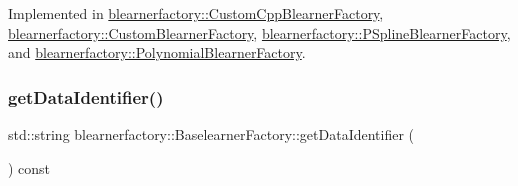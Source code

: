 Implemented in \mbox{\hyperlink{classblearnerfactory_1_1_custom_cpp_blearner_factory_a29cc0d142660d6e52245c264f71dd651}{blearnerfactory\+::\+Custom\+Cpp\+Blearner\+Factory}}, \mbox{\hyperlink{classblearnerfactory_1_1_custom_blearner_factory_a53db4c5d9eb3875241bb47a8d73744e2}{blearnerfactory\+::\+Custom\+Blearner\+Factory}}, \mbox{\hyperlink{classblearnerfactory_1_1_p_spline_blearner_factory_a9363131f08b3b3c1c482786347d13f7c}{blearnerfactory\+::\+P\+Spline\+Blearner\+Factory}}, and \mbox{\hyperlink{classblearnerfactory_1_1_polynomial_blearner_factory_addce36fbb590b2cd3d9325b53ae74566}{blearnerfactory\+::\+Polynomial\+Blearner\+Factory}}.

\mbox{\label{classblearnerfactory_1_1_baselearner_factory_a40703963bb3fd273b835a99263d9b599}} 
\subsubsection{\texorpdfstring{get\+Data\+Identifier()}{getDataIdentifier()}}
{\footnotesize\ttfamily std\+::string blearnerfactory\+::\+Baselearner\+Factory\+::get\+Data\+Identifier (\begin{DoxyParamCaption}{ }\end{DoxyParamCaption}) const}

